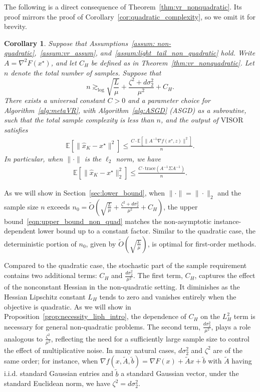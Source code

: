 \documentclass[11pt,twoside]{article}
\numberwithin{equation}{section}
\newcommand{\EE}{\mathbb{E}}
\newcommand{\trace}[1]{\mathrm{trace}\left(#1\right)}
\newcommand{\1}{\mathbf{1}}
\newtheorem{corollary}[theorem]{Corollary}
\theoremstyle{remark}
\theoremstyle{plain}
\newcommand{\liph}{L_H}
\newcommand{\algname}{\mathrm{VISOR}}
\newcommand{\ch}{C_H}
\begin{document}
The following is a direct consequence of Theorem~\ref{thm:vr_nonquadratic}. Its proof mirrors the proof of Corollary~\ref{cor:quadratic_complexity}, so we omit it for brevity.
\begin{corollary}\label{cor:vr_nonquadratic}
Suppose that  Assumptions~\ref{assum: non-quadratic},~\ref{assum:vr_assum}, and~\ref{assum:light_tail_non_quadratic} hold.  Write $A = \nabla^2 F(x^\star)$, and let $C_H$ be defined as in Theorem~\ref{thm:vr_nonquadratic}. Let $n$ denote the total number of samples. Suppose that 
$$n \gtrsim_{\log} \sqrt{ \frac{L}{\mu} }+ \frac{\zeta^2 + d\sigma_2^2}{\mu^2} + C_H.$$ 
There exists a universal constant \(C>0\) and a parameter choice for Algorithm~\ref{alg:metaVR}, with Algorithm~\ref{alg:ASGD} (ASGD) as a subroutine, such that the total sample complexity is less than \(n\), and the output of $\algname$ satisfies
\begin{align*}
	\EE[\|\widehat x_K - x^\star\|^2] \le \frac{C \cdot  \EE[\|A^{-1} \nabla f(x^\star, z)\|^2]}{n}.
\end{align*}
In particular, when $\|\cdot\|$ is the $\ell_2$ norm, we have 
\begin{align}\label{eqn:upper_bound_non_quad}
	\EE[\|\widehat x_K - x^\star\|_2^2] \le   \frac{C \cdot\trace{A^{-1}\Sigma A^{-1}}}{n} .
\end{align}
\end{corollary}

As we will show in Section~\ref{sec:lower_bound}, when $\|\cdot\| = \| \cdot \|_2$ and the sample size $n$ exceeds $n_0 = \tilde O\left( \sqrt{ \frac{L}{\mu} }+ \frac{\zeta^2 + d\sigma_2^2}{\mu^2} + C_H \right)$, the upper bound~\ref{eqn:upper_bound_non_quad} matches the non-asymptotic instance-dependent lower bound up to a constant factor. Similar to the quadratic case, the deterministic portion of $n_0$, given by $\tilde O\left(\sqrt{\frac{L}{\mu}}\right)$, is   optimal for first-order methods. 

Compared to the quadratic case, the stochastic part of the sample requirement contains two additional terms: $\ch$ and $\frac{d\sigma_2^2}{\mu^2}$. The first term, $\ch$, captures the effect of the nonconstant Hessian in the non-quadratic setting. It diminishes as the Hessian Lipschitz constant $\liph$ tends to zero and vanishes entirely when the objective is quadratic. As we will show in Proposition~\ref{prop:necessity_liph_intro}, the dependence of $C_H$ on the $\liph^2$ term is necessary for general non-quadratic problems. The second term, $\frac{d\sigma_2^2}{\mu^2}$, plays a role analogous to $\frac{\zeta^2}{\mu^2}$, reflecting the need for a sufficiently large sample size to control the effect of multiplicative noise. In many natural cases, $d\sigma_2^2$ and $\zeta^2$ are of the same order; for instance, when $\nabla f(x, \tilde A, \tilde b) = \nabla F(x) + \tilde A x + \tilde b$ with $\tilde A$ having i.i.d. standard Gaussian entries and $\tilde b$ a standard Gaussian vector, under the standard Euclidean norm, we have $\zeta^2 = d\sigma_2^2$.
\end{document}
